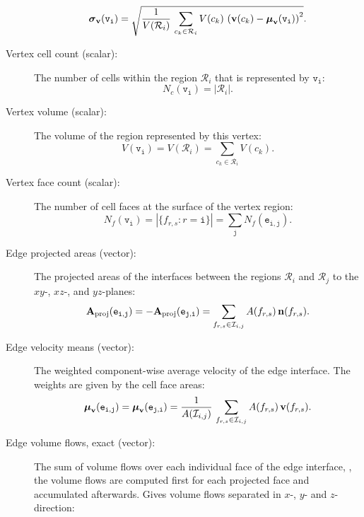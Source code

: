 \begin{description}
%
\begin{equation}
	\boldsymbol\sigma_\vec{v}(\mathtt{v_i}) = \sqrt{
		\normprod{
			\frac{1}{V(\mathcal{R}_i)}
		}{
			\sum\limits_{c_k\in\mathcal{R}_i}{
			 	\normprod{
			 		V(c_k)
			 	}{
			 		\left( \vec{v}(c_k) - \boldsymbol\mu_\vec{v}(\mathtt{v_i}) \right)^2 
			 	}
			} 
		}
	}.
\end{equation}
%
%
  \item[Vertex cell count (scalar):] The number of cells within the region $\mathcal R_i$ that is represented by $\mathtt{v_i}$:
%
\begin{equation}
	N_c(\mathtt{v_i}) = \left| \mathcal{R}_i \right|.
\end{equation}
%
%
\item[Vertex volume (scalar):] The volume of the region represented by this vertex:
%
\begin{equation}
	V(\mathtt{v_i}) = V(\mathcal{R}_i) = \sum\limits_{c_k\in\mathcal{R}_i}{V(c_k)}.
\end{equation}
%
%
  \item[Vertex face count (scalar):] The number of cell faces at the surface of the vertex region:
%
\begin{equation}
	N_f(\mathtt{v_i}) =\left| \{f_{r,s}:r = \mathtt{i}\} \right| = \sum\limits_\mathtt{j}{N_f(\mathtt{e_{i,j}})}.
\end{equation}
%
%
  \item[Edge projected areas (vector):] The projected areas of the interfaces between the regions $\mathcal R_i$ and $\mathcal R_j$ to the $xy$-, $xz$-, and $yz$-planes:
%
\begin{equation}
	\vec{A}_\text{proj}(\mathtt{e_{i,j}}) = 
	-\vec{A}_\text{proj}(\mathtt{e_{j,i}}) =
		\sum\limits_{f_{r,s}\in\mathcal{I}_{i,j}}{ 
			\normprod{
				A(f_{r,s})
			}{
				\vec{n}(f_{r,s}) 
			}
		}.
\end{equation}
%
%
  \item[Edge velocity means (vector):] The weighted component-wise average velocity of the edge interface. The weights are given by the cell face areas:
%
\begin{equation}
	\boldsymbol\mu_\vec{v}(\mathtt{e_{i,j}}) =
	\boldsymbol\mu_\vec{v}(\mathtt{e_{j,i}}) =
	\normprod{ 
		\frac{1}{A(\mathcal{I}_{i,j})}
	}{
		\sum\limits_{f_{r,s}\in\mathcal{I}_{i,j}}{
			\normprod{
				A(f_{r,s})
			}{
				\vec{v}(f_{r,s}) 
			}
		}
	}.
\end{equation}
%
%
  \item[Edge volume flows, exact (vector):] The sum of volume flows over each individual face of the edge interface, \ie, the volume flows are computed first for each projected face and accumulated afterwards. Gives volume flows separated in $x$-, $y$- and $z$-direction:

\end{description}
